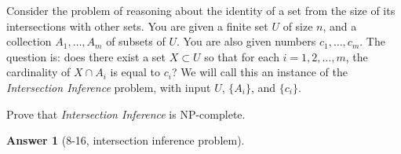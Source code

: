 \documentclass[11pt]{article}
\theoremstyle{numberplain}
\theoremstyle{nonumberplain}
\newtheorem{ans}{Answer}
\newcommand{\0}{{\mathbf{0}}}
\begin{document}
\begin{ques}[8-16] 
Consider the problem of reasoning about the identity of
a set from the size of its intersections with other sets.
You are given a finite set $U$ of size $n$, and
a collection $A_1, \ldots, A_m$ of subsets of $U$.
You are also given numbers $c_1, \ldots, c_m$.
The question is: does there exist a set $X \subset U$
so that for each $i = 1, 2, \ldots, m$,
the cardinality of $X \cap A_i$ is equal to $c_i$?
We will call this an instance of the
{\em Intersection Inference} problem,
with input $U$, $\{A_i\}$, and $\{c_i\}$.

Prove that {\em Intersection Inference} is NP-complete.
\end{ques}
\begin{ans}[8-16, intersection inference problem]
\end{ans}
\end{document}
